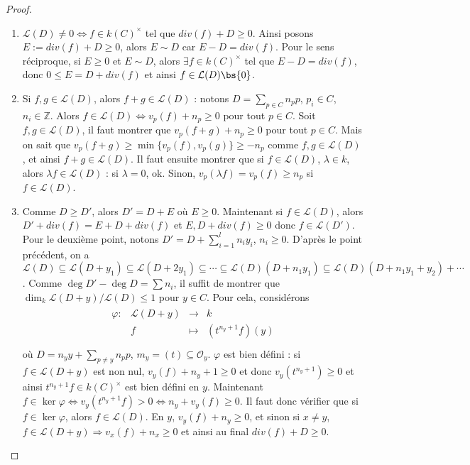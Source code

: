             \begin{proof}
                \begin{enumerate}
                    \item $\mathcal{L}(D) \neq 0 \iff f \in k(C)^\times$ tel que $div(f) + D \geq 0$. Ainsi posons $E := div(f) + D \geq 0$, alors $E \sim D$ car $E - D = div(f)$. Pour le sens réciproque, si $E \geq 0$ et $E \sim D$, alors $\exists f \in k(C)^\times$ tel que $E - D = div(f)$, donc $0 \leq E = D + div(f)$ et ainsi $f \in \mathcal{L}(D) \bs \{0\}$.
                    \item Si $f,g \in \mathcal{L}(D)$, alors $f + g \in \mathcal{L}(D)$ : notons $D = \sum_{p \in C} n_pp$, $p_i \in C$, $n_i \in \mathbb{Z}$. Alors $f \in \mathcal{L}(D) \iff v_p(f) + n_p \geq 0$ pour tout $p \in C$. Soit $f,g \in \mathcal{L}(D)$, il faut montrer que $v_p(f + g) + n_p \geq 0$ pour tout $p \in C$. Mais on sait que $v_p(f + g) \geq \min \{v_p(f), v_p(g)\} \geq -n_p$ comme $f,g \in \mathcal{L}(D)$, et ainsi $f + g \in \mathcal{L}(D)$. Il faut ensuite montrer que si $f \in \mathcal{L}(D)$, $\lambda \in k$, alors $\lambda f \in \mathcal{L}(D)$ : si $\lambda = 0$, ok. Sinon, $v_p(\lambda f) = v_p(f) \geq n_p$ si $f \in \mathcal{L}(D)$.
                    \item Comme $D \geq D'$, alors $D' = D + E$ où $E \geq 0$. Maintenant si $f \in \mathcal{L}(D)$, alors $D' + div(f) = E + D + div(f)$ et $E, D + div(f) \geq 0$ donc $f \in \mathcal{L}(D')$. Pour le deuxième point, notons $D' = D + \sum_{i = 1} ^l n_iy_i$, $n_i \geq 0$. D'après le point précédent, on a $\mathcal{L}(D) \subseteq \mathcal{L}(D + y_1) \subseteq \mathcal{L}(D + 2y_1) \subseteq \cdots \subseteq \mathcal{L}(D)(D + n_1y_1) \subseteq \mathcal{L}(D)(D + n_1y_1 + y_2) + \cdots$. Comme $\deg D' - \deg D = \sum n_i$, il suffit de montrer que $\dim_k \mathcal{L}(D + y)/\mathcal{L}(D) \leq 1$ pour $y \in C$. Pour cela, considérons
                    \begin{align*}
                        \begin{array}{cccc}
                            \varphi : & \mathcal{L}(D + y) & \to & k \\
                            & f & \mapsto & (t^{n_y + 1}f)(y)\\
                        \end{array}
                    \end{align*}
                    où $D = n_yy + \sum_{p \neq y} n_pp$, $m_y = (t) \subseteq \mathcal{O}_y$. $\varphi$ est bien défini : si $f \in \mathcal{L}(D + y)$ est non nul, $v_y(f) + n_y + 1 \geq 0$ et donc $v_y(t^{n_y + 1}) \geq 0$ et ainsi $t^{n_y + 1}f \in k(C)^\times$ est bien défini en $y$. Maintenant $f \in \ker \varphi \iff v_y(t^{n_y + 1}f) > 0 \iff n_y + v_y(f) \geq 0$. Il faut donc vérifier que si $f \in \ker \varphi$, alors $f \in \mathcal{L}(D)$. En $y$, $v_y(f) + n_y \geq 0$, et sinon si $x \neq y$, $f \in \mathcal{L}(D + y) \Rightarrow v_x(f) + n_x \geq 0$ et ainsi au final $div(f) + D \geq 0$.

\end{enumerate}
\end{proof}
